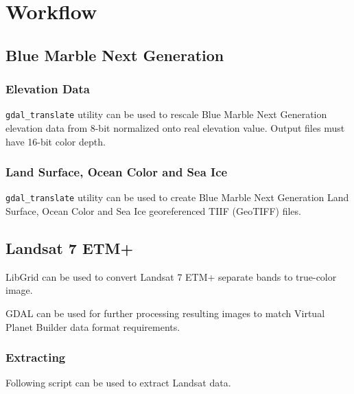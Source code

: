 \chapter{Workflow}

\section{Blue Marble Next Generation}

\subsection{Elevation Data}

\texttt{gdal\_translate} utility can be used to rescale Blue Marble Next Generation elevation data from 8-bit normalized onto real elevation value. Output files must have 16-bit color depth.

\begin{codelistbash}
  
\end{codelistbash}

\subsection{Land Surface, Ocean Color and Sea Ice}

\texttt{gdal\_translate} utility can be used to create Blue Marble Next Generation Land Surface, Ocean Color and Sea Ice georeferenced TIIF (GeoTIFF) files. 

\begin{codelistbash}
  
\end{codelistbash}

\section{Landsat 7 ETM+}

LibGrid can be used to convert Landsat 7 ETM+ separate bands to true-color image. \cite{Terrain-OpenTerrain}

GDAL can be used for further processing resulting images to match Virtual Planet Builder data format requirements.

\subsection{Extracting}

Following script can be used to extract Landsat data.

